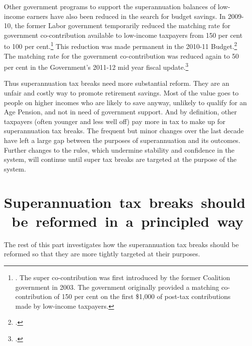 Other government programs to support the superannuation balances of low-income earners have also been reduced in the search for budget savings. In 2009-10, the former Labor government temporarily reduced the matching rate for government co-contribution available to low-income taxpayers from 150 per cent to 100 per cent.\footnote{\textcite{Treasury2009BudgetPapers0910}. The super co-contribution was first introduced by the former Coalition government in 2003. The government originally provided a matching co-contribution\DEVIATION{} of 150 per cent on the first \$1,000 of post-tax contributions made by low-income taxpayers.}   
This reduction was made permanent in the 2010-11 Budget.\footcite[][298]{Treasury2010Budget1011no2}  
The matching rate for the government co-contribution was reduced again to 50 per cent in the Government’s 2011-12 mid year fiscal update.\footcite[][291]{Treasury2011MYEFO1112} 

Thus superannuation tax breaks need more substantial reform. They are an unfair and costly way to promote retirement savings. Most of the value goes to people on higher incomes who are likely to save anyway, unlikely to qualify for an Age Pension, and not in need of government support. And by definition, other taxpayers (often younger and less well off) pay more in tax to make up for superannuation tax breaks. The frequent but minor changes over the last decade have left a large gap between the purposes of superannuation and its outcomes. Further changes to the rules, which undermine stability and confidence in the system, will continue until super tax breaks are targeted at the purpose of the system.


\section{\mbox{Superannuation tax breaks should be reformed in a principled way}\label{sec:SUPER-3-9}}
The rest of this part investigates how the superannuation tax breaks should be reformed so that they are more tightly targeted at their purposes. 

